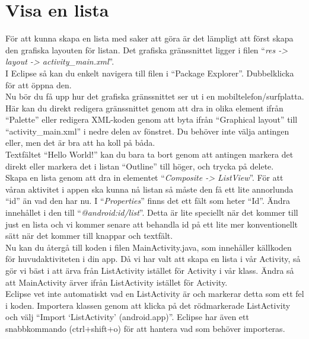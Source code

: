 \documentclass[11 pt]{article} %
\begin{document}
\section{Visa en lista}
För att kunna skapa en lista med saker att göra är det lämpligt att först skapa den grafiska layouten för listan. Det grafiska gränssnittet ligger i filen “\textit{res -> layout -> activity\_main.xml}”.\\
I Eclipse så kan du enkelt navigera till filen i “Package Explorer”. Dubbelklicka för att öppna den.\\

Nu bör du få upp hur det grafiska gränssnittet ser ut i en mobiltelefon/surfplatta. Här kan du direkt redigera gränssnittet genom att dra in olika element ifrån “Palette” eller redigera XML-koden genom att byta ifrån “Graphical layout” till “activity\_main.xml” i nedre delen av fönstret. Du behöver inte välja antingen eller, men det är bra att ha koll på båda.\\

Textfältet “Hello World!” kan du bara ta bort genom att antingen markera det direkt eller markera det i listan “Outline” till höger, och trycka på delete.\\ 

Skapa en lista genom att dra in elementet “\textit{Composite -> ListView}”. För att våran aktivitet i appen ska kunna nå listan så måste den få ett lite annorlunda “id” än vad den har nu. I “\textit{Properties}” finns det ett fält som heter “Id”. Ändra innehållet i den till “\textit{@android:id/list}”. Detta är lite speciellt när det kommer till just en lista och vi kommer senare att behandla id på ett lite mer konventionellt sätt när det kommer till knappar och textfält.\\

Nu kan du återgå till koden i filen MainActivity.java, som innehåller källkoden för huvudaktiviteten i din app.
Då vi har valt att skapa en lista i vår Activity, så gör vi bäst i att ärva från ListActivity istället för Activity i vår klass.
Ändra så att MainActivity ärver ifrån ListActivity istället för Activity. \\

Eclipse vet inte automatiskt vad en ListActivity är och markerar detta som ett fel i koden. Importera klassen genom att klicka på det rödmarkerade ListActivity och välj “Import ‘ListActivity’ (android.app)”. Eclipse har även ett snabbkommando (ctrl+shift+o) för att hantera vad som behöver importeras.\\
\end{document}

